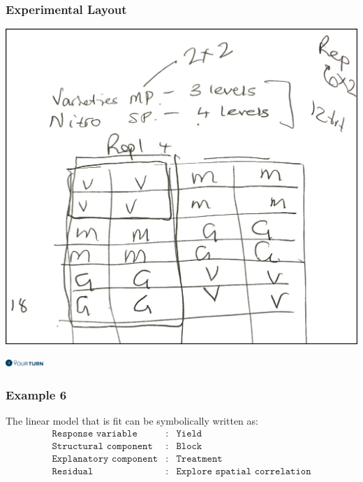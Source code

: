 \begin{frame}\frametitle{Experimental Layout}

\begin{center}
\includegraphics[height = 0.7\textheight]{exptlayout.png}
\end{center}
\flushright
\includegraphics[height = 0.3cm]{yourturn}
\end{frame}


\begin{frame}\frametitle{Example 6}
The linear model that is fit can be symbolically written as:
\begin{eqnarray*}
	\texttt{Response variable}&:& \texttt{Yield} \\
	\texttt{Structural component}&:& \texttt{Block}\\
	\texttt{Explanatory component}&:& \texttt{Treatment}\\
	\texttt{Residual}&:& \texttt{Explore spatial correlation}
\end{eqnarray*}
\end{frame}


